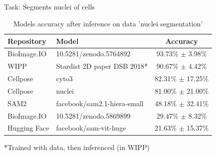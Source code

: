 \subsection{\slidetitle}
\begin{frame}
  \frametitle{\sectiontitle}
  \framesubtitle{\slidetitle}

  Task: Segments nuclei of cells

  \begin{center}
    \begin{table}
        \begin{tabular}{|l|l|c|}
            \hline
            \rowcolor{tableFirstRowColor}  Repository   & Model                         & Accuracy \\ [0.5ex]
            \hline
            \cellcolor{tableFirstColColor} BioImage.IO  & 10.5281/zenodo.5764892        & 93.73\% $\pm$ 3.98\% \\
            \hline
            \cellcolor{tableFirstColColor} WIPP         & Stardist 2D paper DSB 2018*    & 90.67\% $\pm$ 4.42\% \\
            \hline
            \cellcolor{tableFirstColColor} Cellpose     & cyto3                         & 82.31\% $\pm$ 17.25\% \\
            \hline
            \cellcolor{tableFirstColColor} Cellpose     & nuclei                        & 81.00\% $\pm$ 21.00\% \\
            \hline
            \hline
            \cellcolor{tableFirstColColor} SAM2         & facebook/sam2.1-hiera-small   & 48.18\% $\pm$ 32.41\% \\
            \hline
            \cellcolor{tableFirstColColor} BioImage.IO  & 10.5281/zenodo.5869899        & 29.47\% $\pm$ 8.32\% \\
            \hline
            \cellcolor{tableFirstColColor} Hugging Face & facebook/sam-vit-huge         & 21.63\% $\pm$ 15.37\% \\
            \hline
        \end{tabular}
      \caption{Models accuracy after inference on data 'nuclei segmentation'}
    \end{table}
  \end{center}

  *Trained with data, then inferenced (in WIPP)

\end{frame}

